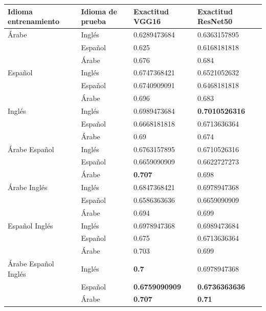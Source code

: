 \documentclass[runningheads]{llncs}
\begin{document}
\begin{table}
\centering
\begin{tabular}{|l|l|l|l|} 
\hline
Idioma entrenamiento & Idioma de prueba & Exactitud VGG16 & Exactitud ResNet50  \\ 
\hline
Árabe                & Inglés           & 0.6289473684    & 0.6363157895        \\ 
\cline{2-4}
                     & Español          & 0.625           & 0.6168181818        \\ 
\cline{2-4}
                     & Árabe            & 0.676           & 0.684               \\ 
\hline
Español              & Inglés           & 0.6747368421    & 0.6521052632        \\ 
\cline{2-4}
                     & Español          & 0.6740909091    & 0.6468181818        \\ 
\cline{2-4}
                     & Árabe            & 0.696           & 0.683               \\ 
\hline
Inglés               & Inglés           & 0.6989473684    & \textbf{0.7010526316}        \\ 
\cline{2-4}
                     & Español          & 0.6668181818    & 0.6713636364        \\ 
\cline{2-4}
                     & Árabe            & 0.69            & 0.674               \\ 
\hline
Árabe Español        & Inglés           & 0.6763157895    & 0.6710526316        \\ 
\cline{2-4}
                     & Español          & 0.6659090909    & 0.6622727273        \\ 
\cline{2-4}
                     & Árabe            & \textbf{0.707}          & 0.698               \\ 
\hline
Árabe Inglés         & Inglés           & 0.6847368421    & 0.6978947368        \\ 
\cline{2-4}
                     & Español          & 0.6586363636    & 0.6659090909        \\ 
\cline{2-4}
                     & Árabe            & 0.694           & 0.699               \\ 
\hline
Español Inglés       & Inglés           & 0.6978947368    & 0.6989473684        \\ 
\cline{2-4}
                     & Español          & 0.675           & 0.6713636364        \\ 
\cline{2-4}
                     & Árabe            & 0.703           & 0.699               \\ 
\hline
Árabe Español Inglés & Inglés           & \textbf{0.7}             & 0.6978947368        \\ 
\cline{2-4}
                     & Español          & \textbf{0.6759090909}    & \textbf{0.6736363636}        \\ 
\cline{2-4}
                     & Árabe            & \textbf{0.707}           & \textbf{0.71}                \\
\hline
\end{tabular}
\end{table}
\end{document}
